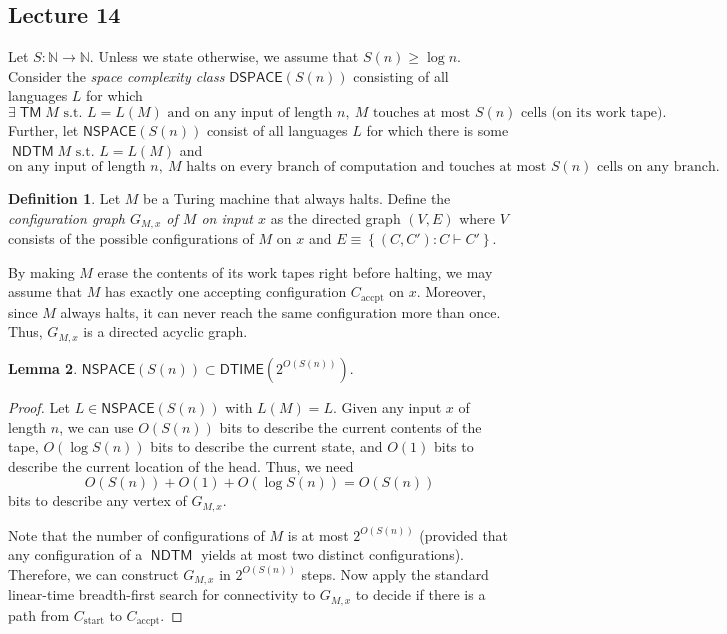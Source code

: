 \documentclass[10pt,letterpaper,cm]{nupset}
\theoremstyle{definition}
\newtheorem{definition}{Definition}[subsection]
\theoremstyle{theorem}
\newtheorem{lemma}[definition]{Lemma}
\theoremstyle{remark}
\newcommand{\N}{\mathbb N}
\newcommand{\1}{\mathbf{1}}
\newcommand{\accpt}{\mathrm{accpt}}
\newcommand{\0}{\vec 0}
\DeclareMathOperator{\TM}{\mathsf{TM}}
\DeclareMathOperator{\NDTM}{\mathsf{NDTM}}
\begin{document}
\subsection{Lecture 14}

Let $S: \N \to \N$. Unless we state otherwise, we assume that $S(n) \geq \log{n}$.
Consider the \textit{space complexity class} 
$\mathsf{DSPACE}(S(n))$ consisting of all languages $L$ for which $$\exists \TM M\text{ s.t. }L = L(M) \text{ and on any input of length }n,\ M \text{ touches at most }S(n)\text{ cells (on its work tape)}.$$
Further, let $\mathsf{NSPACE}(S(n))$ consist of all languages $L$ for which  there is some $\NDTM M\text{ s.t. } L = L(M)$ and
\[
\text{on any input of length }n,\ M\text{ halts on every branch of computation and touches at most }S(n)\text{ cells on any branch}.
\]


\begin{definition}\label{Configg}
Let $M$ be a Turing machine that always halts. Define the \textit{configuration graph $G_{M,x}$ of $M$ on input $x$} as the directed graph $\left(V, E\right)$ where $V$ consists of the possible configurations of $M$ on $x$ and $E \equiv \left\{\left(C,C'\right) : C \vdash C'\right\}$.
\end{definition}

 By making $M$ erase the contents of its work tapes right before halting, we may assume that $M$ has exactly one accepting configuration $C_{\accpt}$ on $x$.
Moreover,
since $M$ always halts, it can never reach the same configuration more than once. Thus, $G_{M,x}$ is a directed acyclic graph.  


\begin{lemma}
$\mathsf{NSPACE}(S(n)) \subset \mathsf{DTIME}\left(2^{O(S(n))}\right)$.
\end{lemma}
\begin{proof}
Let $L \in \mathsf{NSPACE}(S(n)) $ with $L(M) = L$.  Given any input $x$ of length $n$, we can use $O(S(n))$ bits to describe the current contents of the tape, $O(\log{S(n)})$ bits to describe the current state, and $O(1)$ bits to describe the current location of the head. Thus, we need $$O(S(n)) + O(1) + O(\log{S(n)})= O(S(n))$$ bits to describe any vertex of $G_{M,x}$. 

Note that the number of configurations of $M$ is at most $2^{O(S(n))}$ (provided that any configuration of a $\NDTM$ yields at most two distinct configurations).  Therefore, we can construct $G_{M,x}$ in $2^{O(S(n))}$ steps. Now apply the standard linear-time breadth-first search for connectivity to $G_{M,x}$ to decide if there is a path from $C_{\mathrm{start}}$ to $C_{\accpt}$. 
\end{proof}
\end{document}
